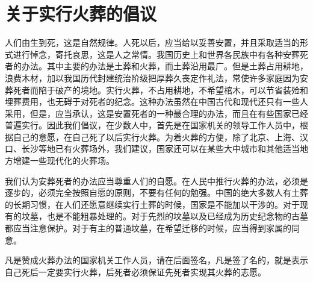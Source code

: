 \section[关于实行火葬的倡议（一九五六年四月十七日）]{关于实行火葬的倡议}


人们由生到死，这是自然规律。人死以后，应当给以妥善安置，并且采取适当的形式进行悼念，寄托哀思，这是人之常情。我国历史上和世界各民族中有各种安葬死者的办法。其中主要的办法是土葬和火葬，而土葬沿用最广。但是土葬占用耕地，浪费木材，加以我国历代封建统治阶级把厚葬久丧定作礼法，常使许多家庭因为安葬死者而陷于破产的境地。实行火葬，不占用耕地，不希望棺木，可以节省装殓和埋葬费用，也无碍于对死者的纪念。这种办法虽然在中国古代和现代还只有一些人采用，但是，应当承认，这是安置死者的一种最合理的办法，而且在有些国家已经普遍实行。因此我们倡议，在少数人中，首先是在国家机关的领导工作人员中，根据自己的意愿，在自己死了以后实行火葬。为着火葬的方便，除了北京、上海、汉口、长沙等地已有火葬场外，我们建议，国家还可以在某些大中城市和其他适当地方增建一些现代化的火葬场。

我们认为安葬死者的办法应当尊重人们的自愿。在人民中推行火葬的办法，必须是逐步的，必须完全按照自愿的原则，不要有任何的勉强。中国的绝大多数人有土葬的长期习惯，在人们还愿意继续实行土葬的时候，国家是不能加以干涉的。对于现有的坟墓，也是不能粗暴处理的。对于先烈的坟墓以及已经成为历史纪念物的古墓都应当注意保护。对于有主的普通坟墓，在希望迁移的时候，应当得到家属的同意。

凡是赞成火葬办法的国家机关工作人员，请在后面签名，凡是签了名的，就是表示自己死后一定要实行火葬，后死者必须保证先死者实现其火葬的志愿。


